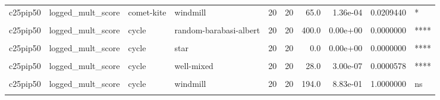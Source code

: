 \documentclass[
]{book}
\begin{document}
\begin{table}
\begin{tabular}{l|l|l|l|r|r|r|r|r|l}
\hline
\cellcolor{gray!6}{c25pip50} & \cellcolor{gray!6}{logged\_mult\_score} & \cellcolor{gray!6}{comet-kite} & \cellcolor{gray!6}{wheel} & \cellcolor{gray!6}{20} & \cellcolor{gray!6}{20} & \cellcolor{gray!6}{0.0} & \cellcolor{gray!6}{0.00e+00} & \cellcolor{gray!6}{0.0000000} & \cellcolor{gray!6}{****}\\
\hline
c25pip50 & logged\_mult\_score & comet-kite & windmill & 20 & 20 & 65.0 & 1.36e-04 & 0.0209440 & *\\
\hline
\cellcolor{gray!6}{c25pip50} & \cellcolor{gray!6}{logged\_mult\_score} & \cellcolor{gray!6}{cycle} & \cellcolor{gray!6}{linear-chain} & \cellcolor{gray!6}{20} & \cellcolor{gray!6}{20} & \cellcolor{gray!6}{176.0} & \cellcolor{gray!6}{5.29e-01} & \cellcolor{gray!6}{1.0000000} & \cellcolor{gray!6}{ns}\\
\hline
c25pip50 & logged\_mult\_score & cycle & random-barabasi-albert & 20 & 20 & 400.0 & 0.00e+00 & 0.0000000 & ****\\
\hline
\cellcolor{gray!6}{c25pip50} & \cellcolor{gray!6}{logged\_mult\_score} & \cellcolor{gray!6}{cycle} & \cellcolor{gray!6}{random-waxman} & \cellcolor{gray!6}{20} & \cellcolor{gray!6}{20} & \cellcolor{gray!6}{392.0} & \cellcolor{gray!6}{0.00e+00} & \cellcolor{gray!6}{0.0000003} & \cellcolor{gray!6}{****}\\
\hline
c25pip50 & logged\_mult\_score & cycle & star & 20 & 20 & 0.0 & 0.00e+00 & 0.0000000 & ****\\
\hline
\cellcolor{gray!6}{c25pip50} & \cellcolor{gray!6}{logged\_mult\_score} & \cellcolor{gray!6}{cycle} & \cellcolor{gray!6}{toroidal-lattice} & \cellcolor{gray!6}{20} & \cellcolor{gray!6}{20} & \cellcolor{gray!6}{45.0} & \cellcolor{gray!6}{6.90e-06} & \cellcolor{gray!6}{0.0012507} & \cellcolor{gray!6}{**}\\
\hline
c25pip50 & logged\_mult\_score & cycle & well-mixed & 20 & 20 & 28.0 & 3.00e-07 & 0.0000578 & ****\\
\hline
\cellcolor{gray!6}{c25pip50} & \cellcolor{gray!6}{logged\_mult\_score} & \cellcolor{gray!6}{cycle} & \cellcolor{gray!6}{wheel} & \cellcolor{gray!6}{20} & \cellcolor{gray!6}{20} & \cellcolor{gray!6}{0.0} & \cellcolor{gray!6}{0.00e+00} & \cellcolor{gray!6}{0.0000000} & \cellcolor{gray!6}{****}\\
\hline
c25pip50 & logged\_mult\_score & cycle & windmill & 20 & 20 & 194.0 & 8.83e-01 & 1.0000000 & ns\\
\hline
\cellcolor{gray!6}{c25pip50} & \cellcolor{gray!6}{logged\_mult\_score} & \cellcolor{gray!6}{linear-chain} & \cellcolor{gray!6}{random-barabasi-albert} & \cellcolor{gray!6}{20} & \cellcolor{gray!6}{20} & \cellcolor{gray!6}{400.0} & \cellcolor{gray!6}{0.00e+00} & \cellcolor{gray!6}{0.0000000} & \cellcolor{gray!6}{****}\\

\end{tabular}
\end{table}
\end{document}
